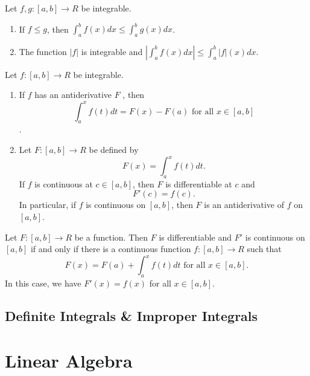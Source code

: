 \documentclass[a4paper,oneside]{book}
\begin{document}
\begin{proposition}
Let $f, g : [a, b] \to R$ be integrable.
\begin{enumerate}
\item If $f \le g$, then  $\int_{a}^{b} f (x)dx \le \int_{a}^{b} g(x)dx$.
\item The function $\left|f\right|$ is integrable and $ \left|\int_{a}^{b} f (x)dx\right| \le  \int_{a}^{b} \left|f\right|(x)dx$.
\end{enumerate}
\end{proposition}
\begin{proposition}
 Let $f : [a, b] \to R$ be integrable.
 \begin{enumerate}
\item If $f$ has an antiderivative $F$ , then
$$ \int_{a}^{x}f (t)dt = F (x) - F (a)  \text{ for all } x \in [a, b]$$.
\item Let $F : [a, b] \to R$ be defined by
$$F (x) = \int_{a}^{x} f (t)dt.$$
If $f$ is continuous at $c \in [a, b]$, then $F$ is differentiable at $c$ and
$$ F'(c) = f (c). $$ In particular, if $f$ is continuous on $[a, b]$, then $F$ is an antiderivative of $f$
on $[a, b]$.
 \end{enumerate}
\end{proposition}
\begin{proposition}
Let $F : [a, b] \to R$ be a function. Then $F$ is differentiable
and $F'$ is continuous on $[a, b]$ if and only if there is a continuous function $f : [a, b] \to R$ such that
 $$F (x) = F (a) + \int_{a}^{x}f (t)dt \text{ for all } x \in [a, b].$$
In this case, we have $F'(x) = f (x)$ for all $x \in [a, b]$.
\end{proposition}
\chapter{Definite Integrals \& Improper Integrals}



















\part{Linear Algebra}
\end{document}
